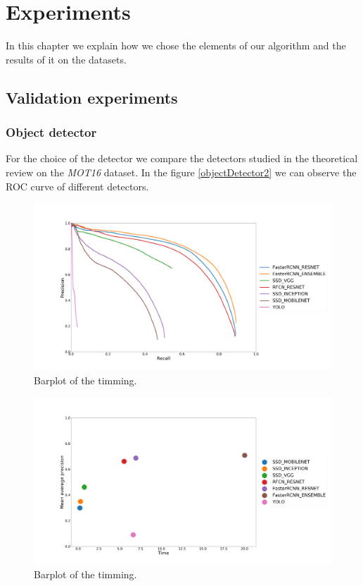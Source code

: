 \chapter{Experiments}\label{cap.experiments}


In this chapter we explain how we chose the elements of our algorithm and the results of it on the datasets.

\section{Validation experiments}\label{valdiation}



\subsection{Object detector}\label{valdiation:det}

For the choice of the detector we compare the detectors studied in the theoretical review on the \textit{MOT16} dataset. In the figure \ref{objectDetector2} we can observe the ROC curve of different detectors.



\begin{figure}[H]
\centering         
\includegraphics[width=0.9\linewidth]{evaluacionObject/dadas.png}
\caption{Barplot of the timming.} \label{timing1}
\end{figure}

\begin{figure}[H]
\centering         
\includegraphics[width=0.9\linewidth]{evaluacionObject/meanAverage2.png}
\caption{Barplot of the timming.} \label{timing1}
\end{figure}




